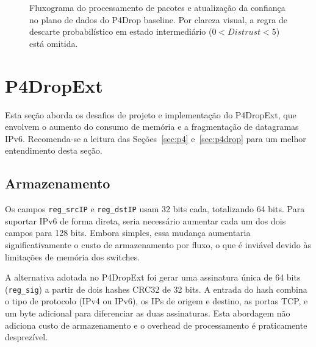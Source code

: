 \documentclass[12pt]{article}
\begin{document}
\begin{figure}[htbp]
\caption{Fluxograma do processamento de pacotes e atualização da confiança no plano de dados do P4Drop baseline. Por clareza visual, a regra de descarte probabilístico em estado intermediário ($0 < Distrust < 5$) está omitida.}
\label{fig:p4drop:flowchart}
\end{figure}

\section{P4DropExt}
\label{sec:p4drope}

Esta seção aborda os desafios de projeto e implementação do P4DropExt,
que envolvem o aumento do consumo de memória e a fragmentação de datagramas IPv6.
Recomenda-se a leitura das Seções~\ref{sec:p4} e~\ref{sec:p4drop} para um melhor entendimento desta seção.

\subsection{Armazenamento}
\label{sec:p4de:armaz}

Os campos \texttt{reg\_srcIP} e \texttt{reg\_dstIP} usam 32 bits cada, totalizando 64 bits.
Para suportar IPv6 de forma direta, seria necessário aumentar cada um dos dois campos para 128 bits.
Embora simples, essa mudança aumentaria significativamente o custo de armazenamento por fluxo,
o que é inviável devido às limitações de memória dos switches.

A alternativa adotada no P4DropExt foi gerar uma assinatura única de 64 bits (\texttt{reg\_sig}) a partir de dois hashes CRC32 de 32 bits.
A entrada do hash combina o tipo de protocolo (IPv4 ou IPv6), os IPs de origem e destino, as portas TCP,
e um byte adicional para diferenciar as duas assinaturas.
Esta abordagem não adiciona custo de armazenamento e o overhead de processamento é praticamente desprezível.
\end{document}
